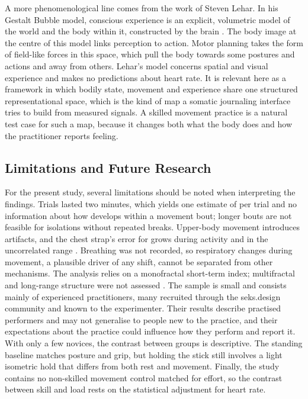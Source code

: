 A more phenomenological line comes from the work of Steven Lehar. In his Gestalt Bubble model, conscious experience is an explicit, volumetric model of the world and the body within it, constructed by the brain \citep{lehar2003bbs,lehar2003book}. The body image at the centre of this model links perception to action. Motor planning takes the form of field-like forces in this space, which pull the body towards some postures and actions and away from others. Lehar's model concerns spatial and visual experience and makes no predictions about heart rate. It is relevant here as a framework in which bodily state, movement and experience share one structured representational space, which is the kind of map a somatic journaling interface tries to build from measured signals. A skilled movement practice is a natural test case for such a map, because it changes both what the body does and how the practitioner reports feeling. 

\subsection{Limitations and Future Research}
\label{sec:limitations}

For the present study, several limitations should be noted when interpreting the findings. Trials lasted two minutes, which yields one estimate of \al{} per trial and no information about how \al{} develops within a movement bout; longer bouts are not feasible for isolations without repeated breaks. Upper-body movement introduces artifacts, and the chest strap's error for \al{} grows during activity and in the uncorrelated range \citep{schaffarczyk2022,cassirame2025}. Breathing was not recorded, so respiratory changes during movement, a plausible driver of any shift, cannot be separated from other mechanisms. The analysis relies on a monofractal short-term index; multifractal and long-range structure were not assessed \citep{goldberger2002}. The sample is small and consists mainly of experienced practitioners, many recruited through the seks.design community and known to the experimenter. Their results describe practised performers and may not generalise to people new to the practice, and their expectations about the practice could influence how they perform and report it. With only a few novices, the contrast between groups is descriptive. The standing baseline matches posture and grip, but holding the stick still involves a light isometric hold that differs from both rest and movement. Finally, the study contains no non-skilled movement control matched for effort, so the contrast between skill and load rests on the statistical adjustment for heart rate.

